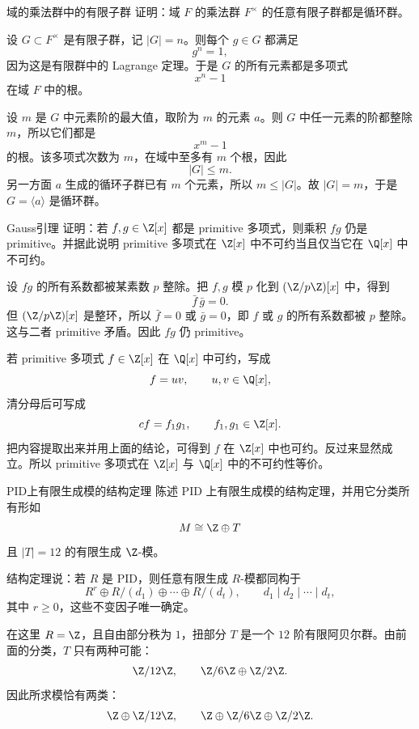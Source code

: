 \begin{problem}{域的乘法群中的有限子群}
\hard
证明：域 $F$ 的乘法群 $F^\times$ 的任意有限子群都是循环群。
\end{problem}
\begin{solution}
设 $G\subset F^\times$ 是有限子群，记 $|G|=n$。则每个 $g\in G$ 都满足
\[
g^n=1,
\]
因为这是有限群中的 Lagrange 定理。于是 $G$ 的所有元素都是多项式
\[
x^n-1
\]
在域 $F$ 中的根。

设 $m$ 是 $G$ 中元素阶的最大值，取阶为 $m$ 的元素 $a$。则 $G$ 中任一元素的阶都整除 $m$，所以它们都是
\[
x^m-1
\]
的根。该多项式次数为 $m$，在域中至多有 $m$ 个根，因此
\[
|G|\le m.
\]
另一方面 $a$ 生成的循环子群已有 $m$ 个元素，所以 $m\le|G|$。故 $|G|=m$，于是 $G=\langle a\rangle$ 是循环群。
\end{solution}

\begin{problem}{Gauss引理}
\hard
证明：若 $f,g\in\Z[x]$ 都是 primitive 多项式，则乘积 $fg$ 仍是 primitive。并据此说明 primitive 多项式在 $\Z[x]$ 中不可约当且仅当它在 $\Q[x]$ 中不可约。
\end{problem}
\begin{solution}
设 $fg$ 的所有系数都被某素数 $p$ 整除。把 $f,g$ 模 $p$ 化到 $(\Z/p\Z)[x]$ 中，得到
\[
\bar f\,\bar g=0.
\]
但 $(\Z/p\Z)[x]$ 是整环，所以 $\bar f=0$ 或 $\bar g=0$，即 $f$ 或 $g$ 的所有系数都被 $p$ 整除。这与二者 primitive 矛盾。因此 $fg$ 仍 primitive。

若 primitive 多项式 $f\in\Z[x]$ 在 $\Q[x]$ 中可约，写成
\[
f=uv,
\qquad u,v\in\Q[x],
\]
清分母后可写成
\[
cf=f_1g_1,
\qquad f_1,g_1\in\Z[x].
\]
把内容提取出来并用上面的结论，可得到 $f$ 在 $\Z[x]$ 中也可约。反过来显然成立。所以 primitive 多项式在 $\Z[x]$ 与 $\Q[x]$ 中的不可约性等价。
\end{solution}

\begin{problem}{PID上有限生成模的结构定理}
\hard
陈述 PID 上有限生成模的结构定理，并用它分类所有形如
\[
M\cong \Z\oplus T
\]
且 $|T|=12$ 的有限生成 $\Z$-模。
\end{problem}
\begin{solution}
结构定理说：若 $R$ 是 PID，则任意有限生成 $R$-模都同构于
\[
R^r\oplus R/(d_1)\oplus\cdots\oplus R/(d_t),
\qquad d_1\mid d_2\mid\cdots\mid d_t,
\]
其中 $r\ge0$，这些不变因子唯一确定。

在这里 $R=\Z$，且自由部分秩为 $1$，扭部分 $T$ 是一个 $12$ 阶有限阿贝尔群。由前面的分类，$T$ 只有两种可能：
\[
\Z/12\Z,
\qquad
\Z/6\Z\oplus\Z/2\Z.
\]
因此所求模恰有两类：
\[
\Z\oplus\Z/12\Z,
\qquad
\Z\oplus\Z/6\Z\oplus\Z/2\Z.
\]
\end{solution}

